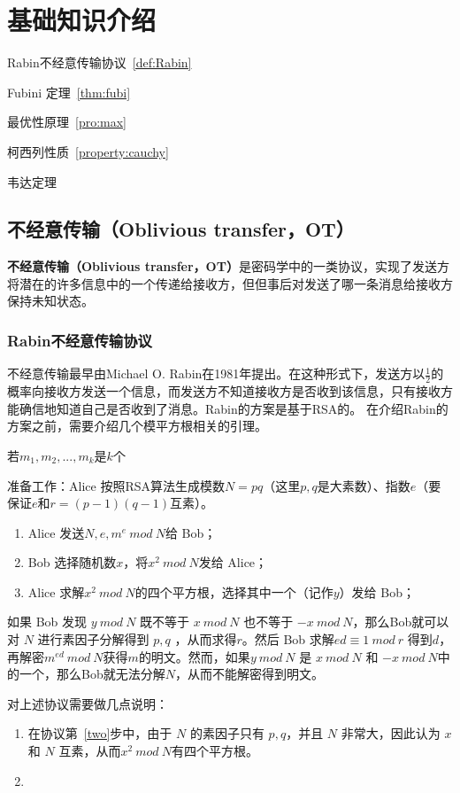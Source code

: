 \documentclass[lang=cn,newtx,10pt,scheme=chinese]{elegantbook}
\begin{document}
\chapter{基础知识介绍}

\begin{introduction}
	\item Rabin不经意传输协议~\ref{def:Rabin}
	\item Fubini 定理~\ref{thm:fubi}
	\item 最优性原理~\ref{pro:max}
	\item 柯西列性质~\ref{property:cauchy}
	\item 韦达定理
\end{introduction}

\section{不经意传输（Oblivious transfer，OT）}
\textbf{不经意传输（Oblivious transfer，OT）}是密码学中的一类协议，实现了发送方将潜在的许多信息中的一个传递给接收方，但但事后对发送了哪一条消息给接收方保持未知状态。

\subsection{Rabin不经意传输协议}
不经意传输最早由Michael O. Rabin在1981年提出。在这种形式下，发送方以$\frac{1}{2}$的概率向接收方发送一个信息，而发送方不知道接收方是否收到该信息，只有接收方能确信地知道自己是否收到了消息。Rabin的方案是基于RSA的。
在介绍Rabin的方案之前，需要介绍几个模平方根相关的引理。
\begin{lemma}
	若$m_1,m_2,...,m_k$是$k$个
\end{lemma}
\begin{definition} \label{def:Rabin} 
	准备工作：Alice 按照RSA算法生成模数$N=pq$（这里$p,q$是大素数）、指数$e$（要保证$e$和$r=(p-1)(q-1)$互素）。
\begin{enumerate}
	\item Alice 发送$N,e,m^e\ mod\ N$给 Bob；
	\item\label{two} Bob 选择随机数$x$，将$x^2\ mod\ N$发给 Alice；
	\item Alice 求解$x^2\ mod\ N$的四个平方根，选择其中一个（记作$y$）发给 Bob；
\end{enumerate}
	如果 Bob 发现 $y\ mod\ N$ 既不等于 $x\ mod\ N$ 也不等于 $-x\ mod\ N$，那么Bob就可以对 $N$ 进行素因子分解得到 $p,q$ ，从而求得$r$。然后 Bob 求解$ed\equiv 1\ mod\ r$ 得到$d$，再解密$m^{ed}\ mod\ N$获得$m$的明文。然而，如果$y\ mod\ N$ 是 $x\ mod\ N$ 和 $-x\ mod\ N$中的一个，那么Bob就无法分解$N$，从而不能解密得到明文。
\end{definition}
\begin{remark}
	对上述协议需要做几点说明：
\begin{enumerate}
	\item 在协议第~\ref{two}步中，由于 $N$ 的素因子只有 $p,q$，并且 $N$ 非常大，因此认为 $x$ 和 $N$ 互素，从而$x^2\ mod\ N$有四个平方根。
	\item 
\end{enumerate}
\end{remark}
\end{document}
